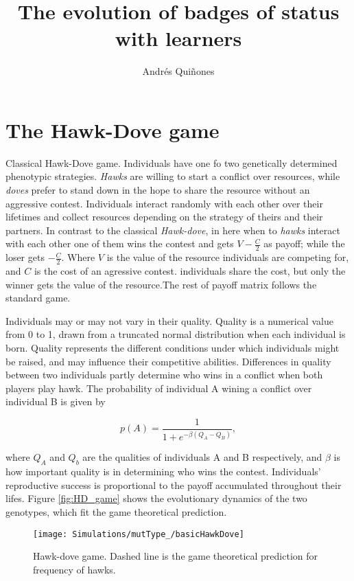 \documentclass[]{article}
\title{The evolution of badges of status with learners}
\author{Andrés Quiñones}
\date{}
\begin{document}
\maketitle

\section{The Hawk-Dove game}\label{the-hawk-dove-game}

Classical Hawk-Dove game. Individuals have one fo two genetically
determined phenotypic strategies. \emph{Hawks} are willing to start a
conflict over resources, while \emph{doves} prefer to stand down in the
hope to share the resource without an aggressive contest. Individuals
interact randomly with each other over their lifetimes and collect
resources depending on the strategy of theirs and their partners. In
contrast to the classical \emph{Hawk-dove}, in here when to \emph{hawks}
interact with each other one of them wins the contest and gets
\(V-\frac{C}{2}\) as payoff; while the loser gets \(-\frac{C}{2}\).
Where \(V\) is the value of the resource individuals are competing for,
and \(C\) is the cost of an agressive contest. individuals share the
cost, but only the winner gets the value of the resource.The rest of
payoff matrix follows the standard game.

Individuals may or may not vary in their quality. Quality is a numerical
value from 0 to 1, drawn from a truncated normal distribution when each
individual is born. Quality represents the different conditions under
which individuals might be raised, and may influence their competitive
abilities. Differences in quality between two individuals partly
determine who wins in a conflict when both players play hawk. The
probability of individual A wining a conflict over individual B is given
by

\begin{equation}
p(A)=\frac{1}{1+e^{-\beta(Q_A-Q_B)}},
\end{equation}

where \(Q_A\) and \(Q_b\) are the qualities of individuals A and B
respectively, and \(\beta\) is how important quality is in determining
who wins the contest. Individuals' reproductive success is proportional
to the payoff accumulated throughout their lifes. Figure
\ref{fig:HD_game} shows the evolutionary dynamics of the two genotypes,
which fit the game theoretical prediction.

\begin{figure}
\texttt{[image: Simulations/mutType\_/basicHawkDove]} \caption{\label{fig:HD_game}Hawk-dove game. Dashed line is the  game theoretical prediction for frequency of hawks.}\label{fig:fig1}
\end{figure}
\end{document}
